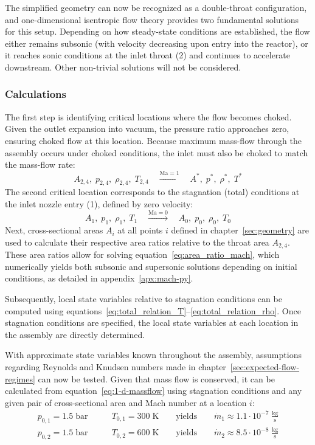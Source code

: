 The simplified geometry can now be recognized as a double-throat configuration, and one-dimensional isentropic flow theory provides two fundamental solutions for this setup.
Depending on how steady-state conditions are established, the flow either remains subsonic (with velocity decreasing upon entry into the reactor), or it reaches sonic conditions at the inlet throat (2) and continues to accelerate downstream.
Other non-trivial solutions will not be considered.
\cite{SALAS1986193, EMMONS1958}

\subsubsection*{Calculations}
	The first step is identifying critical locations where the flow becomes choked.
	Given the outlet expansion into vacuum, the pressure ratio approaches zero, ensuring choked flow at this location.
	Because maximum mass-flow through the assembly occurs under choked conditions, the inlet must also be choked to match the mass-flow rate:
	$$
		A_{2,4},\;p_{2,4},\;\rho_{2,4},\;T_{2,4}
			\quad \xrightarrow {\mathrm{Ma} = 1} \quad
		A^*,\;p^*,\;\rho^*,\;T^*
	$$
	The second critical location corresponds to the stagnation (total) conditions at the inlet nozzle entry (1), defined by zero velocity:
	$$
		A_1,\;p_1,\;\rho_1,\;T_1
			\quad \xrightarrow{\mathrm{Ma}=0} \quad
		A_0,\;p_0,\;\rho_0,\;T_0
	$$
	Next, cross-sectional areas $A_i$ at all points $i$ defined in chapter~\ref{sec:geometry} are used to calculate their respective area ratios relative to the throat area $A_{2,4}$.
	These area ratios allow for solving equation~\eqref{eq:area_ratio_mach}, which numerically yields both subsonic and supersonic solutions depending on initial conditions, as detailed in appendix~\ref{apx:mach-py}.

	Subsequently, local state variables relative to stagnation conditions can be computed using equations~\eqref{eq:total_relation_T}–\eqref{eq:total_relation_rho}.
	Once stagnation conditions are specified, the local state variables at each location in the assembly are directly determined.

	

	With approximate state variables known throughout the assembly, assumptions regarding Reynolds and Knudsen numbers made in chapter~\ref{sec:expected-flow-regimes} can now be tested.
	Given that mass flow is conserved, it can be calculated from equation~\eqref{eq:1-d-massflow} using stagnation conditions and any given pair of cross-sectional area and Mach number at a location $i$:
	\begin{align*}
		p_{0,1} = 1.5\;\text{bar}
			&\qquad T_{0,1} = 300\;\text{K}
				\qquad \text{yields} \qquad
			\dot{m}_1 \approx 1.1 \cdot 10^{-7} \; \frac{\text{kg}}{\text{s}}\\
		p_{0,2} = 1.5\;\text{bar}
			&\qquad T_{0,2} = 600\;\text{K}
				\qquad \text{yields} \qquad
			\dot{m}_2 \approx 8.5 \cdot 10^{-8} \; \frac{\text{kg}}{\text{s}}
	\end{align*}

